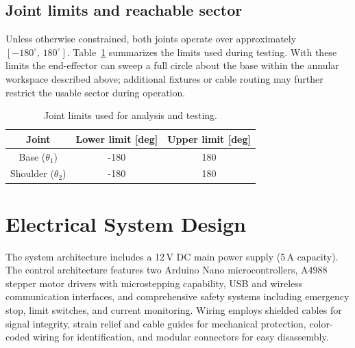 \subsection*{Joint limits and reachable sector}
Unless otherwise constrained, both joints operate over approximately \([-180^{\circ},\,180^{\circ}]\). Table~\ref{tab:joint_limits} summarizes the limits used during testing. With these limits the end-effector can sweep a full circle about the base within the annular workspace described above; additional fixtures or cable routing may further restrict the usable sector during operation.

\begin{table}[H]
\centering
\caption{Joint limits used for analysis and testing.}
\label{tab:joint_limits}
\begin{tabular}{|c|c|c|}
\hline
Joint & Lower limit [deg] & Upper limit [deg] \\
\hline
Base (\(\theta_1\)) & -180 & 180 \\
Shoulder (\(\theta_2\)) & -180 & 180 \\
\hline
\end{tabular}
\end{table}

\section{Electrical System Design}

The system architecture includes a 12\,V DC main power supply (5\,A capacity). The control architecture features two Arduino Nano microcontrollers,
A4988 stepper motor drivers with microstepping capability, USB and wireless communication interfaces, and comprehensive 
safety systems including emergency stop, limit switches, and current monitoring. Wiring employs shielded cables for signal integrity,
strain relief and cable guides for mechanical protection, color-coded wiring for identification, and modular connectors for easy disassembly.

